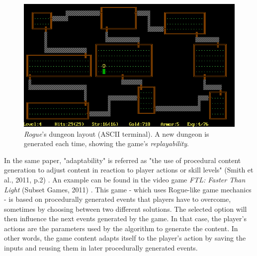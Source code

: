 \begin{figure}[!ht]
    \centering
    \includegraphics[scale=0.4]{Images/Rogue.png}
    \caption{\textit{Rogue}'s dungeon layout (ASCII terminal). A new dungeon is generated each time, showing the game's \textit{replayability}.}
    \label{fig:Rogue}
\end{figure}

In the same paper, "adaptability" is referred as "the use of procedural content generation to adjust content in reaction to player actions or skill levels" (Smith et al., 2011, p.2) \cite{pdf:pcgbased}. An example can be found in the video game \textit{FTL: Faster Than Light} (Subset Games, 2011) \cite{game:ftl}. This game - which uses Rogue-like game mechanics - is based on procedurally generated events that players have to overcome, sometimes by choosing between two different solutions. The selected option will then influence the next events generated by the game. In that case, the player's actions are the parameters used by the algorithm to generate the content. In other words, the game content adapts itself to the player's action by saving the inputs and reusing them in later procedurally generated events.


